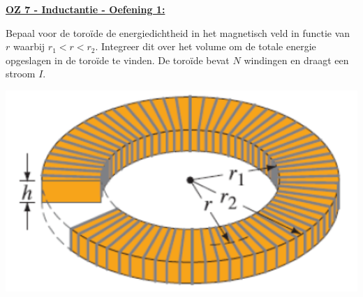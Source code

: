 \textbf{\underline{OZ 7 - Inductantie - Oefening 1:}}
\vspace{0.5cm}

Bepaal voor de toroïde de energiedichtheid in het magnetisch veld in
functie van $r$ waarbij $r_1 < r < r_2$. Integreer dit over het volume om de totale energie
opgeslagen in de toroïde te vinden. De toroïde bevat $N$ windingen en draagt een
stroom $I$.

\begin{center}
    \includegraphics[scale = 0.3]{oz07/resources/Oz7Oef1.png}
\end{center}

